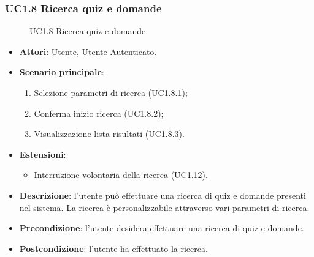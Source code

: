\subsubsection{UC1.8 Ricerca quiz e domande}
\begin{figure}[H]
\centering
\noindent{}
\caption{UC1.8 Ricerca quiz e domande}
\end{figure}
\begin{itemize}
\item \textbf{Attori}: Utente, Utente Autenticato.
\item \textbf{Scenario principale}:
\begin{enumerate}
\item Selezione parametri di ricerca (UC1.8.1);
\item Conferma inizio ricerca (UC1.8.2);
\item Visualizzazione lista risultati (UC1.8.3).
\end{enumerate}
\item \textbf{Estensioni}:
\begin{itemize}
\item Interruzione volontaria della ricerca (UC1.12).
\end{itemize}
\item \textbf{Descrizione}: l'utente può effettuare una ricerca di quiz e domande presenti nel sistema. La ricerca è personalizzabile attraverso vari parametri di ricerca.
\item \textbf{Precondizione}: l'utente desidera effettuare una ricerca di quiz e domande.
\item \textbf{Postcondizione}: l'utente ha effettuato la ricerca.
\end{itemize}
